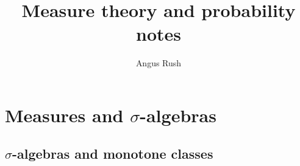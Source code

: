 \documentclass[a4paper,12pt]{scrreprt}
\title{Measure theory and probability notes}
\author{Angus Rush}
\theoremstyle{definition}
\theoremstyle{plain}
\theoremstyle{remark}
\begin{document}
\maketitle
\tableofcontents
%
%
%
%
%
%
%
%
%
%

\chapter{Measures and \texorpdfstring{$\sigma$}{s}-algebras}
\section{\texorpdfstring{$\sigma$}{s}-algebras and monotone classes}
\end{document}
